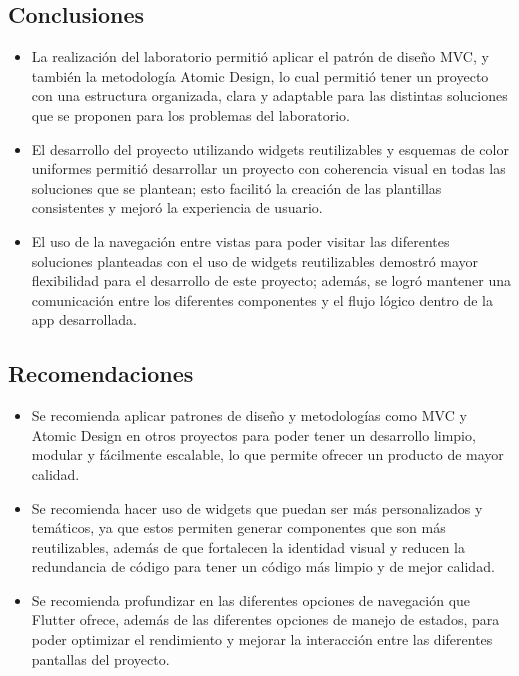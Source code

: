 \subsection{Conclusiones}
\begin{itemize}
    \item La realización del laboratorio permitió aplicar el patrón de diseño MVC, y también la metodología Atomic Design, lo cual permitió tener un proyecto con una estructura organizada, clara y adaptable para las distintas soluciones que se proponen para los problemas del laboratorio.
    
    \item El desarrollo del proyecto utilizando widgets reutilizables y esquemas de color uniformes permitió desarrollar un proyecto con coherencia visual en todas las soluciones que se plantean; esto facilitó la creación de las plantillas consistentes y mejoró la experiencia de usuario.

    \item El uso de la navegación entre vistas para poder visitar las diferentes soluciones planteadas con el uso de widgets reutilizables demostró mayor flexibilidad para el desarrollo de este proyecto; además, se logró mantener una comunicación entre los diferentes componentes y el flujo lógico dentro de la app desarrollada.
\end{itemize}

\subsection{Recomendaciones}
\begin{itemize}
    \item Se recomienda aplicar patrones de diseño y metodologías como MVC y Atomic Design en otros proyectos para poder tener un desarrollo limpio, modular y fácilmente escalable, lo que permite ofrecer un producto de mayor calidad.

    \item Se recomienda hacer uso de widgets que puedan ser más personalizados y temáticos, ya que estos permiten generar componentes que son más reutilizables, además de que fortalecen la identidad visual y reducen la redundancia de código para tener un código más limpio y de mejor calidad.
    
    \item Se recomienda profundizar en las diferentes opciones de navegación que Flutter ofrece, además de las diferentes opciones de manejo de estados, para poder optimizar el rendimiento y mejorar la interacción entre las diferentes pantallas del proyecto.
\end{itemize}